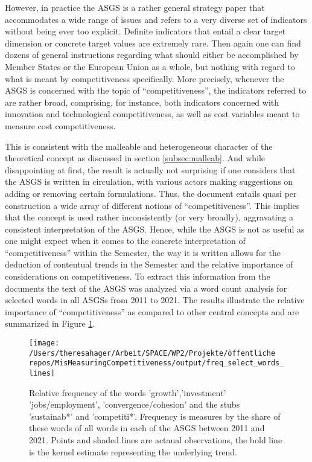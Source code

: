 \documentclass[
]{article}
\begin{document}
However, in practice the ASGS is a rather general strategy paper that
accommodates a wide range of issues and refers to a very diverse set of
indicators without being ever too explicit. Definite indicators that
entail a clear target dimension or concrete target values are extremely rare.
Then again one can find dozens of general instructions regarding what should
either be
accomplished by Member States or the European Union as a whole, but nothing with
regard to what is meant by competitiveness specifically.
More precisely, whenever the ASGS is concerned with the topic of
\enquote{competitiveness}, the indicators referred to are rather broad, comprising,
for instance, both
indicators concerned with innovation and technological competitiveness, as well
as cost variables meant to measure cost competitiveness.

This is consistent with the malleable and heterogeneous character of
the theoretical concept as discussed in section \ref{subsec:malleab}.
And while disappointing at first, the result is actually not surprising if one
considers that the ASGS is written in circulation, with various actors making
suggestions on adding or removing certain formulations. Thus, the document
entails quasi per construction a wide array of different notions of
\enquote{competitiveness}.
This implies that the concept is used rather inconsistently (or very broadly),
aggravating a consistent interpretation of the ASGS.
Hence, while the ASGS is not as useful as one might expect when it comes to the
concrete interpretation of \enquote{competitiveness} within the Semester, the way
it is written allows for the deduction of contentual trends in the Semester
and the relative importance of considerations on competitiveness.
To extract this information from the documents
the text of the ASGS was analyzed via a word count analysis for selected
words in all ASGSs from 2011 to 2021. The results illustrate
the relative importance of \enquote{competitiveness} as compared to other central
concepts and are summarized in Figure \ref{fig:wordcounts2}.

\begin{figure}

{\centering \texttt{[image: /Users/theresahager/Arbeit/SPACE/WP2/Projekte/öffentliche repos/MisMeasuringCompetitiveness/output/freq\_select\_words\_lines]} 

}

\caption{Relative frequency of the words 'growth','investment' 'jobs/employment', 'convergence/cohesion' and the stubs 'sustainab*' and 'competiti*'. Frequency is measures by the share of these words of all words in each of the ASGS between 2011 and 2021. Points and shaded lines are actaual observations, the bold line is the kernel estimate representing the underlying trend.}\label{fig:wordcounts2}
\end{figure}
\end{document}
